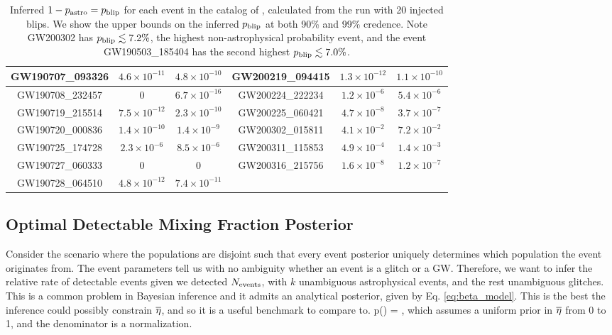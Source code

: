 \begin{refsection}
\begin{table}
{\begin{tabular}{|c|c|c||c|c|c|}
\hline GW190707\_093326 & $4.6\times 10^{-11}$ & $4.8\times 10^{-10}$ & GW200219\_094415 & $1.3\times 10^{-12}$ & $1.1\times 10^{-10}$ \\ 
\hline GW190708\_232457 & $0$ & $6.7\times 10^{-16}$ & GW200224\_222234 & $1.2\times 10^{-6}$ & $5.4\times 10^{-6}$ \\ 
\hline GW190719\_215514 & $7.5\times 10^{-12}$ & $2.3\times 10^{-10}$ & GW200225\_060421 & $4.7\times 10^{-8}$ & $3.7\times 10^{-7}$ \\ 
\hline GW190720\_000836 & $1.4\times 10^{-10}$ & $1.4\times 10^{-9}$ & GW200302\_015811 & $4.1\times 10^{-2}$ & $7.2\times 10^{-2}$ \\ 
\hline GW190725\_174728 & $2.3\times 10^{-6}$ & $8.5\times 10^{-6}$ & GW200311\_115853 & $4.9\times 10^{-4}$ & $1.4\times 10^{-3}$ \\ 
\hline GW190727\_060333 & $0$ & $0$ & GW200316\_215756 & $1.6\times 10^{-8}$ & $1.2\times 10^{-7}$ \\ 
\hline GW190728\_064510 & $4.8\times 10^{-12}$ & $7.4\times 10^{-11}$ &  &  &  \\ \hline
    \end{tabular}}
    \caption{Inferred $1-p_{\rm astro} = p_{\rm blip}$ for each event in the catalog of \protect\cite{PhysRevX.13.011048}, calculated from the run with 20 injected blips. We show the upper bounds on the inferred $p_{\rm blip}$ at both 90\% and 99\% credence. Note GW200302 has $p_{\rm blip} \lesssim 7.2\%$, the highest non-astrophysical probability event, and the event GW190503\_185404 has the second highest $p_{\rm blip} \lesssim 7.0\%$.}
    \label{tab:gw_pastros}
\end{table}

\subsection*{Optimal Detectable Mixing Fraction Posterior}

Consider the scenario where the populations are disjoint such that every event posterior uniquely determines which population the event originates from. The event parameters tell us with no ambiguity whether an event is a glitch or a GW. Therefore, we want to infer the relative rate of detectable events given we detected $N_{\rm events}$, with $k$ unambiguous astrophysical events, and the rest unambiguous glitches.
This is a common problem in Bayesian inference and it admits an analytical posterior, given by Eq. \ref{eq:beta_model}. This is the best the inference could possibly constrain $\overline{\eta}$, and so it is a useful benchmark to compare to. 
\beq
p(\etabar) = ,
\label{eq:beta_model}
\eeq
which assumes a uniform prior in $\overline{\eta}$ from 0 to 1, and the denominator is a normalization.


\end{refsection}
